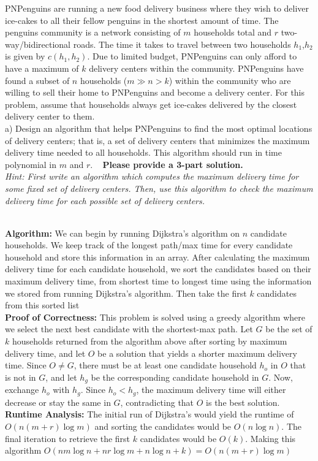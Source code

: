 \documentclass[10.5pt]{article}
\begin{document}
\newpage
{}

PNPenguins are running a new food delivery business where they wish to deliver ice-cakes to all their fellow penguins in the shortest amount of time. The penguins community is a network consisting of $m$ households total and $r$ two-way/bidirectional roads. The time it takes to travel between two households $h_1$,$h_2$ is given by $c(h_1, h_2)$. Due to limited budget, PNPenguins can only afford to have a maximum of $k$ delivery centers within the community. PNPenguins have found a subset of $n$ households ($m \gg n > k$) within the community who are willing to sell their home to PNPenguins and become a delivery center. 
For this problem, assume that households always get ice-cakes delivered by the closest delivery center to them.\\
\newline
a) Design an algorithm that helps PNPenguins to find the most optimal locations of delivery centers; that is, a set of delivery centers that minimizes the maximum delivery time needed to all households. This algorithm should run in time polynomial in $m$ and $r$.
\newline\
\newline
\textbf{Please provide a 3-part solution.}\\
\emph{Hint: First write an algorithm which computes the maximum delivery time for some fixed set of delivery centers. Then, use this algorithm to check the maximum delivery time for each possible set of delivery centers.}\\
\begin{solution}\\ 
  \textbf{Algorithm:}
  We can begin by running Dijkstra's algorithm on $n$ candidate households. We keep track of the longest path/max time for every candidate household and store this information in an array. 
  After calculating the maximum delivery time for each candidate household, we sort the candidates based on their maximum delivery time, from shortest time to longest time using the information we stored 
  from running Dijkstra's algorithm. Then take the first $k$ candidates from this sorted list\\
  \textbf{Proof of Correctness:}
  This problem is solved using a greedy algorithm where we select the next best candidate with the shortest-max path. 
  Let $G$ be the set of $k$ households returned from the algorithm above after sorting by maximum delivery time, and let 
  $O$ be a solution that yields a shorter maximum delivery time. Since $O \neq G$, there must be at least one candidate household $h_o$ in $O$ 
  that is not in $G$, and let $h_g$ be the corresponding candidate household in $G$. Now, exchange $h_o$ with $h_g$. 
  Since $h_o < h_g$, the maximum delivery time will either decrease or stay the same in $G$, contradicting that $O$ is the best solution.\\
  \textbf{Runtime Analysis:} The initial run of Dijkstra's would yield the runtime of $O(n(m + r)\log m)$ and sorting the candidates would
  be $O(n\log n)$. The final iteration to retrieve the first $k$ candidates would be $O(k)$. Making this algorithm $O(nm\log n + nr\log m + n\log n + k) = O(n(m + r)\log m)$
\end{solution}
\end{document}
